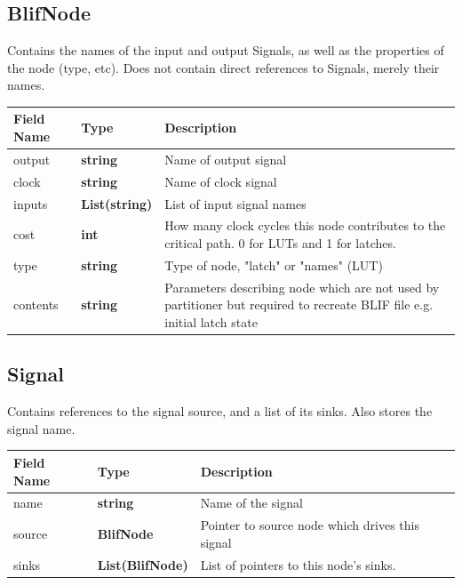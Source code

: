 \documentclass[12pt,final,oneside]{dwThesis} %
\begin{document}
   \subsection{BlifNode}
   Contains the names of the input and output Signals, as well as the properties of the node (type, etc).
   Does not contain direct references to Signals, merely their names.
   \begin{table}
      \begin{tabularx}{\linewidth}{lXX}
         \toprule
         Field Name & Type & Description\\
         \midrule
         output & \textbf{string} & Name of output signal \\
         clock & \textbf{string} & Name of clock signal \\
         inputs & \textbf{List(string)} & List of input signal names \\
         cost & \textbf{int} & How many clock cycles this node contributes to the critical path. 0 for \acp{LUT} and 1 for latches. \\
         type & \textbf{string} & Type of node, "latch" or "names" (\ac{LUT}) \\
         contents & \textbf{string} & Parameters describing node which are not used by partitioner but required to recreate \ac{BLIF} file e.g. initial latch state\\
         \bottomrule
      \end{tabularx}
   \end{table}

   \subsection{Signal}
   Contains references to the signal source, and a list of its sinks. Also stores the signal name.
   \begin{table}
      \begin{tabularx}{\linewidth}{lXX}
         \toprule
         Field Name & Type & Description\\
         \midrule
         name & \textbf{string} & Name of the signal \\
         source & \textbf{BlifNode} & Pointer to source node which drives this signal \\
         sinks & \textbf{List(BlifNode)} & List of pointers to this node's sinks.\\
         \bottomrule
      \end{tabularx}
   \end{table}
\end{document}
